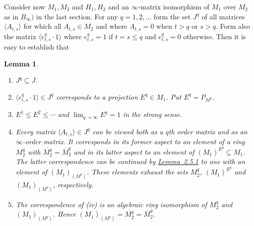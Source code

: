 \documentclass[b5paper,twoside]{article}
\newcommand{\lemref}[2]{\hyperref[#1]{\mbox{Lemma~#2}}}
\theoremstyle{mvnplain}
\newtheorem{lemma}{Lemma}[section]
\newcommand{\M}{\mathbf M}
\newcommand{\Hilbert}{\mathfrak H}
\def\M{M}%
\def\Hilbert{H}%
\def\mathfrak#1{#1}%
\begin{document}
Consider now $\M_1,\M_2$ and $\Hilbert_1,\Hilbert_2$ and an $\infty$-matrix
isomorphism of $\M_1$ over $\M_2$ as in $B_\infty)$ in the last section.  For
any $q=1,2,\ldots$ form the set $\mathfrak J^q$ of all matrices
$\langle A_{t,s}\rangle$ for which all $A_{t,s}\in\M_2$ and where
$A_{t,s}=0$ when $t>q$ or $s>q$.  Form also the matrix
$\langle e^q_{t,s}\cdot1\rangle$ where $e^q_{t,s}=1$ if $t=s\leq q$ and
$e^q_{t,s}=0$ otherwise.  Then it is easy to establish that
\begin{lemma}\label{lem:2.5.2}
\begin{enumerate}[label=(\roman*)]
\item $\mathfrak J^q\subseteq\mathfrak J$.
\item $\langle e^q_{t,s}\cdot1\rangle\in\mathfrak J^q$ corresponds to a
projection $E^q\in\M_1$.  Put $E^q=P_{\mathfrak M^q}$.
\item $E^1\leq E^2\leq\cdots$ and $\lim_{q\to\infty}E^q=1$ in the strong
sense.
\item Every matrix $\langle A_{t,s}\rangle\in\mathfrak J^q$ can be viewed both
as a $q$th order matrix and as an $\infty$-order matrix.  It corresponds in its
former aspect to an element of a ring $\M_2^q$ with
$\overline{\M_2^q}=\overline{\M}_2^q$ and in its latter aspect to an element of
$(\M_1)^{E^q}\subseteq\M_1$.  The latter correspondence can be continued by
\lemref{lem:2.5.1}{2.5.1} to one with an element of
$(\M_1)_{(\mathfrak M^q)}$.  These elements exhaust the sets
$\M_2^q$, $(\M_1)^{E^q}$ and $(\M_1)_{(\mathfrak M^q)}$, respectively.
\item The correspondence of (iv) is an algebraic ring isomorphism of $\M_2^q$
and $(\M_1)_{(\mathfrak M^q)}$.  Hence
$\overline{(\M_1)_{(\mathfrak M^q)}}=\overline{\M_2^q}=\overline{\M}_2^q$.
\end{enumerate}
\end{lemma}
\end{document}

